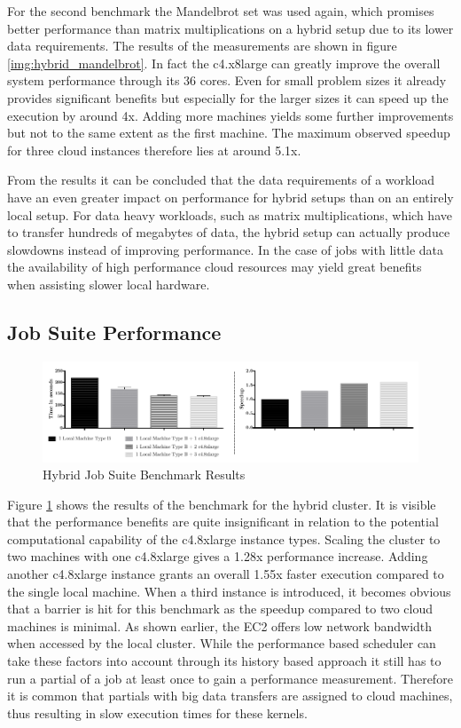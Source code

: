 For the second benchmark the Mandelbrot set was used again, which promises better performance than matrix multiplications on a hybrid setup due to its lower data requirements. The results of the measurements are shown in figure \ref{img:hybrid_mandelbrot}. In fact the c4.x8large can greatly improve the overall system performance through its 36 cores. Even for small problem sizes it already provides significant benefits but especially for the larger sizes it can speed up the execution by around 4x. Adding more machines yields some further improvements but not to the same extent as the first machine. The maximum observed speedup for three cloud instances therefore lies at around 5.1x.

From the results it can be concluded that the data requirements of a workload have an even greater impact on performance for hybrid setups than on an entirely local setup. For data heavy workloads, such as matrix multiplications, which have to transfer hundreds of megabytes of data, the hybrid setup can actually produce slowdowns instead of improving performance. In the case of jobs with little data the availability of high performance cloud resources may yield great benefits when assisting slower local hardware.

\subsection*{Job Suite Performance}

\begin{figure}[H]
	\includegraphics[width=1.0\textwidth]{images/hybrid_full_benchmark_performance_based.pdf}
	\centering
	\caption{Hybrid Job Suite Benchmark Results}
	\label{img:hybrid_benchmark_results}
\end{figure}

Figure \ref{img:hybrid_benchmark_results} shows the results of the benchmark for the hybrid cluster. It is visible that the performance benefits are quite insignificant in relation to the potential computational capability of the c4.8xlarge instance types. Scaling the cluster to two machines with one c4.8xlarge gives a 1.28x performance increase. Adding another c4.8xlarge instance grants an overall 1.55x faster execution compared to the single local machine. When a third instance is introduced, it becomes obvious that a barrier is hit for this benchmark as the speedup compared to two cloud machines is minimal. As shown earlier, the EC2 offers low network bandwidth when accessed by the local cluster. While the performance based scheduler can take these factors into account through its history based approach it still has to run a partial of a job at least once to gain a performance measurement. Therefore it is common that partials with big data transfers are assigned to cloud machines, thus resulting in slow execution times for these kernels.

